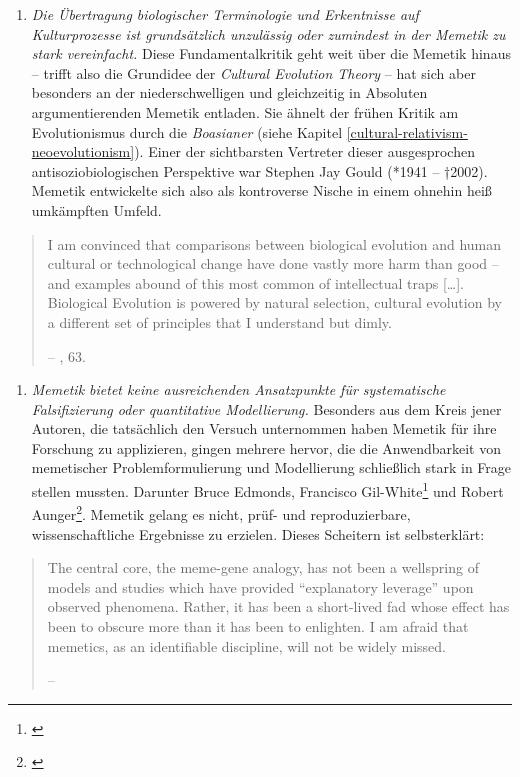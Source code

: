 \documentclass[openany,twoside,twocolumn]{book}
\providecommand{\tightlist}{%
  \setlength{\itemsep}{0pt}\setlength{\parskip}{0pt}}
\let\rmarkdownfootnote\footnote%
\def\footnote{\protect\rmarkdownfootnote}
\begin{document}
\begin{enumerate}
\def\labelenumi{\arabic{enumi}.}
\tightlist
\item
  \emph{Die Übertragung biologischer Terminologie und Erkentnisse auf Kulturprozesse ist grundsätzlich unzulässig oder zumindest in der Memetik zu stark vereinfacht.} Diese Fundamentalkritik geht weit über die Memetik hinaus -- trifft also die Grundidee der \emph{Cultural Evolution Theory} -- hat sich aber besonders an der niederschwelligen und gleichzeitig in Absoluten argumentierenden Memetik entladen. Sie ähnelt der frühen Kritik am Evolutionismus durch die \emph{Boasianer} (siehe Kapitel \ref{cultural-relativism-neoevolutionism}). Einer der sichtbarsten Vertreter dieser ausgesprochen antisoziobiologischen Perspektive war Stephen Jay Gould (*1941 -- †2002). Memetik entwickelte sich also als kontroverse Nische in einem ohnehin heiß umkämpften Umfeld.
\end{enumerate}

\begin{quote}
I am convinced that comparisons between biological evolution and human cultural or technological change have done vastly more harm than good -- and examples abound of this most common of intellectual traps {[}\ldots{}{]}. Biological Evolution is powered by natural selection, cultural evolution by a different set of principles that I understand but dimly.

-- \textcite{gould_pandas_1991}, 63.
\end{quote}

\begin{enumerate}
\def\labelenumi{\arabic{enumi}.}
\setcounter{enumi}{1}
\tightlist
\item
  \emph{Memetik bietet keine ausreichenden Ansatzpunkte für systematische Falsifizierung oder quantitative Modellierung.} Besonders aus dem Kreis jener Autoren, die tatsächlich den Versuch unternommen haben Memetik für ihre Forschung zu applizieren, gingen mehrere hervor, die die Anwendbarkeit von memetischer Problemformulierung und Modellierung schließlich stark in Frage stellen mussten. Darunter Bruce Edmonds, Francisco Gil-White\footnote{\textcite{gil-white_common_2005-1}} und Robert Aunger\footnote{\textcite{aunger_darwinizing_2000}}. Memetik gelang es nicht, prüf- und reproduzierbare, wissenschaftliche Ergebnisse zu erzielen. Dieses Scheitern ist selbsterklärt:
\end{enumerate}

\begin{quote}
The central core, the meme-gene analogy, has not been a wellspring of models and studies which have provided ``explanatory leverage'' upon observed phenomena. Rather, it has been a short-lived fad whose effect has been to obscure more than it has been to enlighten. I am afraid that memetics, as an identifiable discipline, will not be widely missed.

-- \textcite{edmonds_revealed_2005}
\end{quote}
\end{document}

